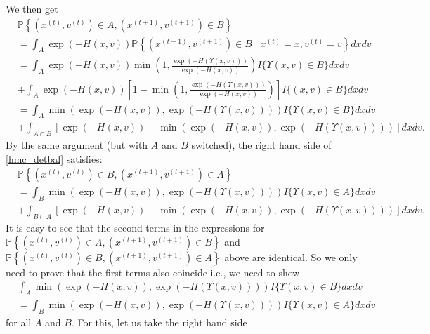 \documentclass{scrartcl}
\renewcommand{\P}{{\mathbb P}}
\begin{document}
             We then get
\begin{align*}
 & \P \left\{(x^{(t)}, v^{(t)}) \in A, (x^{(t+1)}, v^{(t+1)}) \in B
  \right\} \\ &= \int_A \exp(-H(x, v)) \P \left\{(x^{(t+1)}, v^{(t+1)})
                \in B \mid x^{(t)} = x, v^{(t)} = v \right\} dx dv \\
  &= \int_A \exp(-H(x, v)) \min \left(1,\frac{\exp(-H(\Upsilon(x, v)))}{\exp(-H(x, v))}
    \right)  I\{\Upsilon(x, v) \in B\} dx dv \\
  &+ \int_A \exp(-H(x, v)) \left[1 - \min
  \left(1,\frac{\exp(-H(\Upsilon(x, v)))}{\exp(-H(x, v))} 
    \right) \right] I\{(x, v) \in B\} dx dv \\
  &= \int_A \min \left(\exp(-H(x, v)), \exp(-H(\Upsilon(x, v)))
    \right) I\{\Upsilon(x, v) \in B\} dx dv \\
  &+ \int_{A \cap B} \left[\exp(-H(x, v)) - \min \left(\exp(-H(x, v)), \exp(-H(\Upsilon(x, v)))
    \right)  \right] dx dv.
\end{align*}
By the same argument (but with $A$ and $B$ switched), the right hand
side of \eqref{hmc_detbal} satisfies: 
\begin{align*}
  &\P \left\{(x^{(t)}, v^{(t)}) \in B, (x^{(t+1)},
    v^{(t+1)}) \in A  \right\} \\
  &= \int_B \min \left(\exp(-H(x, v)), \exp(-H(\Upsilon(x, v)))
    \right) I\{\Upsilon(x, v) \in A\} dx dv \\
  &+ \int_{B \cap A} \left[\exp(-H(x, v)) - \min \left(\exp(-H(x, v)), \exp(-H(\Upsilon(x, v)))
    \right)  \right] dx dv.
\end{align*}
It is easy to see that the second terms in the expressions for $\P \left\{(x^{(t)}, v^{(t)}) \in A, (x^{(t+1)}, v^{(t+1)}) \in B
  \right\}$ and $\P \left\{(x^{(t)}, v^{(t)}) \in B, (x^{(t+1)},
    v^{(t+1)}) \in A  \right\}$ above are identical. So we only need to
  prove that the first terms also coincide i.e., we need to show
  \begin{equation}\label{hmc_tp}
    \begin{split}
   &\int_A \min \left(\exp(-H(x, v)), \exp(-H(\Upsilon(x, v)))
    \right) I\{\Upsilon(x, v) \in B\} dx dv \\ &=  \int_B \min \left(\exp(-H(x, v)), \exp(-H(\Upsilon(x, v)))
                                                 \right) I\{\Upsilon(x, v) \in A\} dx dv
   \end{split}                                              
\end{equation}
for all $A$ and $B$. For this, let us take the right hand side
\end{document}

